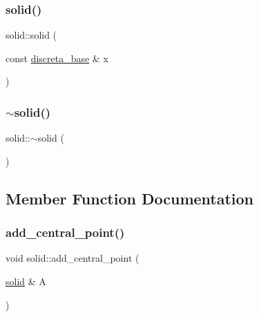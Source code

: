 \mbox{\label{classsolid_a5cbfb36f813a28289bda9739e562af19}} 
\subsubsection{\texorpdfstring{solid()}{solid()}\hspace{0.1cm}{\footnotesize\ttfamily [2/2]}}
{\footnotesize\ttfamily solid\+::solid (\begin{DoxyParamCaption}\item[{const \mbox{\hyperlink{classdiscreta__base}{discreta\+\_\+base}} \&}]{x }\end{DoxyParamCaption})}

\mbox{\label{classsolid_a9c9476c0078fe49bf5e19c4297b2f16d}} 
\subsubsection{\texorpdfstring{$\sim$solid()}{~solid()}}
{\footnotesize\ttfamily solid\+::$\sim$solid (\begin{DoxyParamCaption}{ }\end{DoxyParamCaption})}



\subsection{Member Function Documentation}
\mbox{\label{classsolid_abec108e749250b1fbab7c8dcf98b96ae}} 
\subsubsection{\texorpdfstring{add\+\_\+central\+\_\+point()}{add\_central\_point()}}
{\footnotesize\ttfamily void solid\+::add\+\_\+central\+\_\+point (\begin{DoxyParamCaption}\item[{\mbox{\hyperlink{classsolid}{solid}} \&}]{A }\end{DoxyParamCaption})}

\mbox{\label{classsolid_a972d36c69f629d8f78d3a7fccb5b75ba}} 
